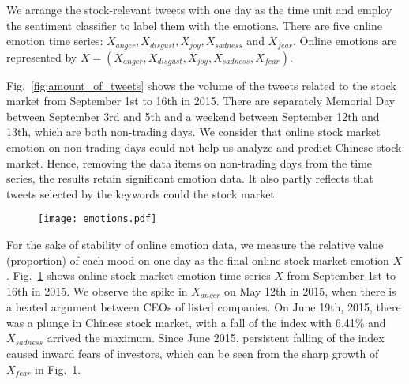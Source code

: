 \documentclass[aps,preprint,groupedaddress]{revtex4-1}
\begin{document}
{} We arrange the stock-relevant tweets with one day as the time unit and employ the sentiment classifier to label them with the emotions. There are five online emotion time series: $X_{anger}, X_{disgust}, X_{joy}, X_{sadness}$ and $X_{fear}$. Online emotions are represented by $X = (X_{anger}, X_{disgust}, X_{joy}, X_{sadness}, X_{fear}).$

{\color{black}{We find the volume of tweets reduces significantly on non-trading days.}} Fig.~\ref{fig:amount_of_tweets} shows the volume of the tweets related to the stock market from September 1st to 16th in 2015. There are separately Memorial Day between September 3rd and 5th and a weekend between September 12th and 13th, which are both non-trading days. We consider that online stock market emotion on non-trading days could not help us analyze and predict Chinese stock market. Hence, removing the data items on non-trading days from the time series, the results retain significant emotion data. It also partly reflects that tweets selected by the keywords could {\color{black}{well represent fluctuations of}} the stock market.

\begin{figure}
\centering
\texttt{[image: emotions.pdf]}
\caption{{\color{black}{Time series of each online stock market emotion from December 1st 2014 to September 16th 2015.}}}
\label{fig:emotion}
\end{figure}


For the sake of stability of online emotion data, we measure the relative value (proportion) of each mood on one day as the final online stock market emotion $X$. Fig.~\ref{fig:emotion} shows online stock market emotion time series $X$ from September 1st to 16th in 2015. We observe the spike in $X_{anger}$ on May 12th in 2015, when there is a heated argument between CEOs of listed companies. On June 19th, 2015, there was a plunge in Chinese stock market, with a fall of the index with 6.41\% and $X_{sadness}$ arrived the maximum. Since June 2015, persistent falling of the index caused inward fears of investors, which can be seen from the sharp growth of $X_{fear}$ in Fig.~\ref{fig:emotion}.
\end{document}

